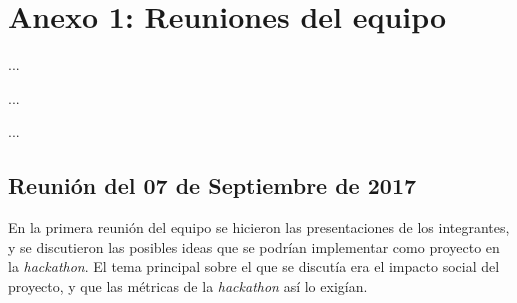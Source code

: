 %
%


\chapter{Anexo 1: Reuniones del equipo}
\label{ap1:Reuniones}

\begin{FraseCelebre}
\begin{Frase}
...
\end{Frase}
\begin{Fuente}
...
\end{Fuente}
\end{FraseCelebre}

\begin{resumen}
...
\end{resumen}

\section{Reunión del 07 de Septiembre de 2017}

En la primera reunión del equipo se hicieron las presentaciones de los integrantes, y se discutieron las posibles ideas que se podrían implementar como proyecto en la \textit{hackathon}.
El tema principal sobre el que se discutía era el impacto social del proyecto, y que las métricas de la \textit{hackathon} así lo exigían.

